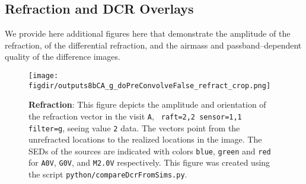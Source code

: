 \documentclass[prd, nofootinbib, floatfix, 11pt, tightenlines, times]{article}
\def\figdir{../figures}
\def\A{{\tt A}}
\begin{document}
\begin{appendices}
\section{Refraction and DCR Overlays}

We provide here additional figures here that demonstrate the amplitude
of the refraction, of the differential refraction, and the airmass and
passband--dependent quality of the difference images.

\begin{figure}[!ht]
  \centering
  \texttt{[image: \\figdir/outputs8bCA\_g\_doPreConvolveFalse\_refract\_crop.png]}
  \caption{{\bf Refraction}: This figure depicts the amplitude and
    orientation of the refraction vector in the visit \A, {\tt
      raft=2,2 sensor=1,1 filter=g}, seeing value {\tt 2} data.  The
    vectors point from the unrefracted locations to the realized
    locations in the image.  The SEDs of the sources are indicated
    with colors {\tt blue}, {\tt green} and {\tt red} for {\tt A0V},
    {\tt G0V}, and {\tt M2.0V} respectively.  This figure was created
    using the script {\tt python/compareDcrFromSims.py}.}
  \label{fig:refractim}
\end{figure}


\end{appendices}
\end{document}
